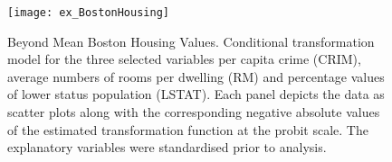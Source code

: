 




\begin{figure}
\texttt{[image: ex\_BostonHousing]}
\caption{Beyond Mean Boston Housing Values. Conditional transformation model
         for the three selected variables per capita crime (CRIM),
         average numbers of rooms per dwelling (RM) and percentage values of lower status
         population (LSTAT). Each panel depicts the data as scatter plots
         along with the corresponding negative absolute values of the  estimated transformation function
         at the probit scale. The explanatory variables were standardised 
         prior to analysis. \label{BostonHousing-plot}}
\end{figure}

